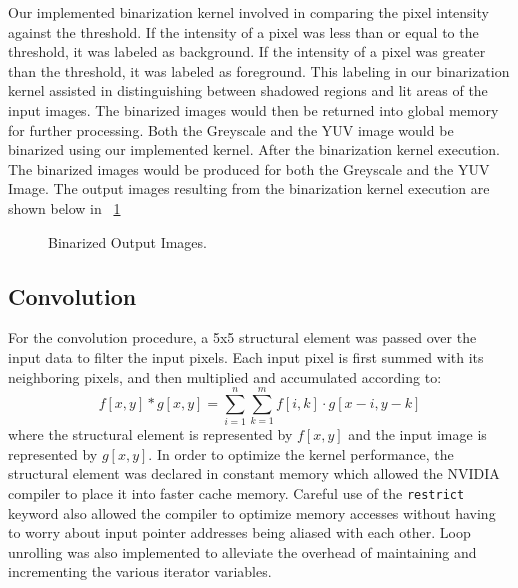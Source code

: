 \documentclass[conference]{IEEEtran}
\begin{document}
         Our implemented binarization kernel involved in comparing the pixel intensity against the threshold. If the intensity of a pixel was less than or equal to the threshold, it was labeled as background. If the intensity of a pixel was greater than the threshold, it was labeled as foreground. This labeling in our binarization kernel assisted in distinguishing between shadowed regions and lit areas of the input images. The binarized images would then be returned into global memory for further processing. Both the Greyscale and the YUV image would be binarized using our implemented kernel. After the binarization kernel execution. The binarized images would be produced for both the Greyscale and the YUV Image.
         The output images resulting from the binarization kernel execution are shown below in \figurename~\ref{fig:Binarization}
         \begin{figure}[h]
         	\centering

         	\caption{Binarized Output Images.}
         	\label{fig:Binarization}
         \end{figure}

      \subsection{Convolution}
         For the convolution procedure, a 5x5 structural element was passed over the input data to filter the input pixels. Each input pixel is first summed with its neighboring pixels, and then multiplied and accumulated according to:
         \begin{equation}\label{eq:Conv}
            f[x,y] * g[x,y] = \sum_{i=1}^{n}\sum_{k=1}^{m}f[i,k] \cdot g[x-i,y-k]
         \end{equation}
         where the structural element is represented by \( f[x,y]\) and the input image is represented by \( g[x,y] \). In order to optimize the kernel performance, the structural element was declared in constant memory which allowed the NVIDIA compiler to place it into faster cache memory. Careful use of the \texttt{restrict} keyword also allowed the compiler to optimize memory accesses without having to worry about input pointer addresses being aliased with each other. Loop unrolling was also implemented to alleviate the overhead of maintaining and incrementing the various iterator variables.
\end{document}
